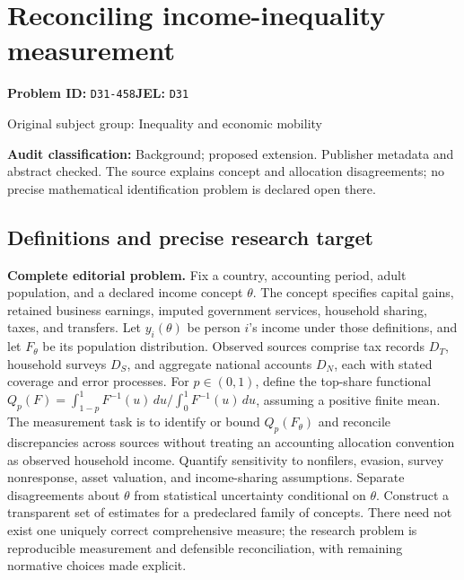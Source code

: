 \documentclass[11pt,a4paper]{article}
\begin{document}
\section*{Reconciling income-inequality measurement}
\textbf{Problem ID:} \texttt{D31-458}\quad \textbf{JEL:} \texttt{D31}\par
\label{problem:OP-0360}
{\sffamily\small\color{muted}Original subject group: Inequality and economic mobility\par}
\label{definitions:problem:30007642}
\textbf{Audit classification:} Background; proposed extension. Publisher metadata and abstract checked. The source explains concept and allocation disagreements; no precise mathematical identification problem is declared open there.
\subsection*{Definitions and precise research target}
\textbf{Complete editorial problem.} Fix a country, accounting period, adult population, and a declared income concept \(\theta\). The concept specifies capital gains, retained business earnings, imputed government services, household sharing, taxes, and transfers. Let \(y_i(\theta)\) be person \(i\)'s income under those definitions, and let \(F_\theta\) be its population distribution. Observed sources comprise tax records \(D_T\), household surveys \(D_S\), and aggregate national accounts \(D_N\), each with stated coverage and error processes. For \(p\in(0,1)\), define the top-share functional \(Q_p(F)=\int_{1-p}^{1}F^{-1}(u)\,du/\int_0^1F^{-1}(u)\,du\), assuming a positive finite mean. The measurement task is to identify or bound \(Q_p(F_\theta)\) and reconcile discrepancies across sources without treating an accounting allocation convention as observed household income. Quantify sensitivity to nonfilers, evasion, survey nonresponse, asset valuation, and income-sharing assumptions. Separate disagreements about \(\theta\) from statistical uncertainty conditional on \(\theta\). Construct a transparent set of estimates for a predeclared family of concepts. There need not exist one uniquely correct comprehensive measure; the research problem is reproducible measurement and defensible reconciliation, with remaining normative choices made explicit.
\end{document}
